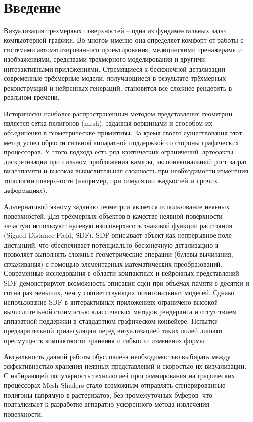 \section{Введение}
\label{sec:Introduction}

Визуализация трёхмерных поверхностей -- одна из фундаментальных задач компьютерной графики. Во многом именно она определяет комфорт от работы с системами автоматизированного проектирования, медицинскими тренажерами и изображениями, средствами трехмерного моделирования и другими интерактивными приложениями. Стремящиеся к бесконечной детализации современные трёхмерные модели, получающиеся в результате трёхмерных реконструкций и нейронных генераций, становится все сложнее рендерить в реальном времени.

Исторически наиболее распространенным методом представления геометрии является сетка полигонов (mesh), заданная вершинами и способом их объединения в геометрические примитивы. За время своего существования этот метод успел обрости сильной аппаратной поддержкой со стороны графических процессоров. У этого подхода есть ряд критических ограничений: артефакты дискретизации при сильном приближении камеры, экспоненциальный рост затрат видеопамяти и высокая вычислительная сложность при необходимости изменения топологии поверхности (например, при симуляции жидкостей и прочих деформациях).

Альтернативой явному заданию геометрии является использование неявных поверхностей. Для трёхмерных объектов в качестве неявной поверхности зачастую используют нулевую изоповерхнсоть знаковой функции расстояния (Signed Distance Field, SDF). SDF описывает объект как непрерывное поле дистанций, что обеспечивает потенциально бесконечную детализацию и позволяет выполнять сложные геометрические операции (булевы вычитания, сглаживания) с помощью элементарных математических преобразований. Современные исследования в области компактных и нейронных представлений SDF демонстрируют возможность описания сцен при объёмах памяти в десятки и сотни раз меньших, чем у соответствующих полигональных моделей. Однако использование SDF в интерактивных приложениях ограничено высокой вычислительной стоимостью классических методов рендеринга и отсутствием аппаратной поддержки в стандартном графическом конвейере. Попытки предварительной триангуляции перед визуализацией таких полей лишают преимуществ компактности хранения и гибкости изменения формы.

\label{ssec:actual}
Актуальность данной работы обусловлена необходимостью выбирать между эффективностью хранения неявных представлений и скоростью их визуализации. С набирающей популярность технологией программирования на графических процессорах Mesh Shaders \cite{nvidia_mesh_shaders} стало возможным отправлять сгенерированные полигоны напрямую в растеризатор, без промежуточных буферов, что подталкивает к разработке аппаратно ускоренного метода извлечения поверхности.


